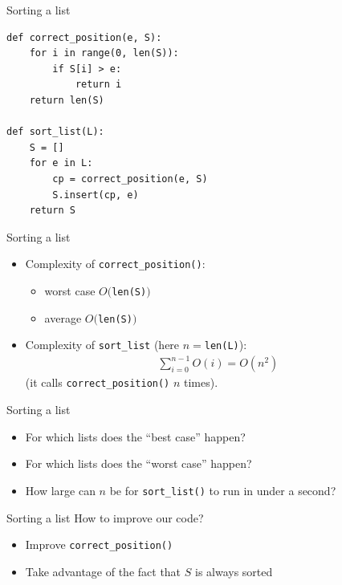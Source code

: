 \documentclass[11pt]{beamer}
\begin{document}
\begin{frame}[fragile]{Sorting a list}
\begin{lstlisting}
def correct_position(e, S):
	for i in range(0, len(S)):
		if S[i] > e:
			return i
	return len(S)

def sort_list(L):
	S = []
	for e in L:
		cp = correct_position(e, S)
		S.insert(cp, e)
	return S
\end{lstlisting}
\end{frame}

\begin{frame}{Sorting a list}
	\begin{itemize}
		\item Complexity of \texttt{correct\_position()}:
			\begin{itemize}
				\item worst case $O($\texttt{len(S)}$)$
				\item average $O($\texttt{len(S)}$)$
			\end{itemize}

		\vspace{0.3cm}
		\item Complexity of \texttt{sort\_list} (here $n=$\texttt{len(L)}):
			\begin{align*}
				\sum_{i=0}^{n-1} O(i) = O(n^2)%
			\end{align*}
			(it calls \texttt{correct\_position()} $n$ times).
	\end{itemize}
\end{frame}

\begin{frame}{Sorting a list}
	\begin{itemize}
		\item For which lists does the ``best case'' happen?
		\item For which lists does the ``worst case'' happen?
		\item How large can $n$ be for \texttt{sort\_list()} to run
		      in under a second?
	\end{itemize}
\end{frame}

\begin{frame}{Sorting a list}
	How to improve our code?
	\begin{itemize}
		\item Improve \texttt{correct\_position()}
		\item Take advantage of the fact that $S$ is always sorted
	\end{itemize}
\end{frame}
\end{document}
